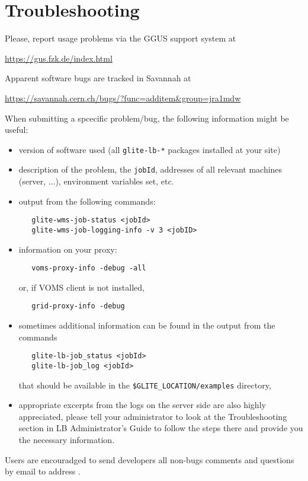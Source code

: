 %
%
\section{Troubleshooting}

Please, report usage problems via the GGUS support system at
\begin{center}
\url{https://gus.fzk.de/index.html}
\end{center}
Apparent software bugs are tracked in Savannah at
\begin{center}
\url{https://savannah.cern.ch/bugs/?func=additem&group=jra1mdw}
\end{center}

When submitting a \LB spcecific problem/bug, the following information might be useful:
\begin{itemize}
\item version of software used (all \verb'glite-lb-*' packages installed at your site)
\item description of the problem, the \verb'jobId', addresses of all relevant
 machines (\LB server, ...), environment variables set, etc.
\item output from the following commands:
\begin{verbatim}
   glite-wms-job-status <jobId>
   glite-wms-job-logging-info -v 3 <jobID>
\end{verbatim}
\item information on your proxy:
\begin{verbatim}
   voms-proxy-info -debug -all
\end{verbatim}
or, if VOMS client is not installed, 
\begin{verbatim}
   grid-proxy-info -debug 
\end{verbatim}
\item sometimes additional information can be found in the output from the commands
\begin{verbatim}
   glite-lb-job_status <jobId>
   glite-lb-job_log <jobId>
\end{verbatim}
that should be available in the \verb'$GLITE_LOCATION/examples' directory,
\item appropriate excerpts from the logs on the server side are also highly appreciated, 
please tell your administrator to look at the Troubleshooting section in LB Administrator's 
Guide \cite{lbag} to follow the steps there and provide you the necessary information.
\end{itemize}

Users are encouradged to send developers all non-bugs comments and questions by email to
address .

